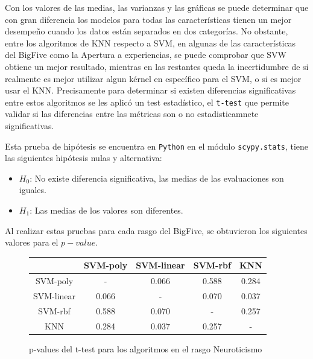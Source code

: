 \documentclass[10pt, a4paper]{article}
\begin{document}
    Con los valores de las medias, las varianzas y las gr\'aficas se puede determinar que 
    con gran diferencia los modelos para todas las caracter\'isticas tienen un mejor desempe\~no cuando los
    datos est\'an separados en dos categor\'ias. No obstante, entre los algoritmos de KNN respecto a SVM, en algunas de 
    las caracter\'isticas del BigFive como la Apertura a experiencias, se puede comprobar que SVW obtiene un 
    mejor resultado, mientras en las restantes queda la incertidumbre de si realmente es mejor utilizar algun k\'ernel en espec\'ifico para el SVM, o si es mejor usar el KNN. 
    Precisamente para determinar si existen diferencias significativas entre estos algoritmos se les aplic\'o un test estad\'istico, 
    el \texttt{t-test} que permite validar si las diferencias entre las m\'etricas son o no estadisticamnete significativas. 

    Esta prueba de hip\'otesis se encuentra en \texttt{Python} en el m\'odulo \texttt{scypy.stats}, tiene las siguientes hip\'otesis nulas y alternativa: 

    \begin{itemize}
        \item [] $H_0$: No existe diferencia significativa, las medias de las evaluaciones son iguales. 
        \item [] $H_1$: Las medias de los valores son diferentes.
    \end{itemize}

    Al realizar estas pruebas para cada rasgo del BigFive, se obtuvieron los siguientes valores para el $p-value$.

    \begin{figure}[H]
        \centering
        \begin{tabular}{|c|c|c|c|c|}
            \cline{2-5} \multicolumn{1}{c|}{ }& SVM-poly& SVM-linear & SVM-rbf & KNN \\ 
            \hline SVM-poly & - & 0.066 &  0.588 & 0.284 \\ 
            \hline SVM-linear & 0.066 & - & 0.070 & 0.037 \\ 
            \hline SVM-rbf & 0.588 & 0.070 & - & 0.257 \\ 
            \hline KNN & 0.284 & 0.037 & 0.257 & - \\ 
            \hline
        \end{tabular}
        \caption{p-values del t-test para los algoritmos en el rasgo Neuroticismo}
    \end{figure}
\end{document}
